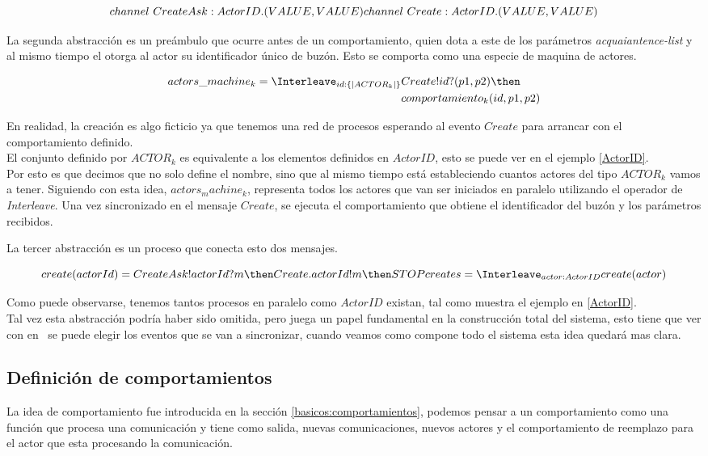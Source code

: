 \[
channel\ CreateAsk:ActorID.(VALUE, VALUE)\\
channel\ Create:ActorID.(VALUE, VALUE)
\]

La segunda abstracción es un preámbulo que ocurre antes de un comportamiento, quien dota a este de 
los parámetros \textit{acquaiantence-list} y al mismo tiempo el otorga al actor su identificador 
único de buzón. Esto se comporta como una especie de maquina de actores.

\begin{align}
actors\_machine_k = \Interleave_{ id : \{| ACTOR_k |\} } & Create!id?(p1, p2) \then \\
&comportamiento_k(id, p1, p2)
\end{align}

En realidad, la creación es algo ficticio ya que tenemos una red de procesos \CSP esperando al 
evento $Create$ para arrancar con el comportamiento definido. \\
El conjunto definido por $ACTOR_k$ es equivalente a los elementos definidos  en $ActorID$, 
esto se puede ver en el ejemplo \ref{ActorID}. \\
Por esto es que decimos que no solo define el nombre, sino que al mismo tiempo está
estableciendo cuantos actores del tipo $ACTOR_k$ vamos a tener.
Siguiendo con esta idea, $actors_machine_k$, representa todos los actores 
que van ser iniciados en paralelo utilizando el operador de \textit{Interleave}.
Una vez sincronizado en el mensaje $Create$, se ejecuta el comportamiento que obtiene
el identificador del buzón y los parámetros recibidos.

La tercer abstracción es un proceso que conecta esto dos mensajes. 
 
\[
create(actorId) = CreateAsk!actorId?m \then Create.actorId!m \then STOP \\
creates = \Interleave_{actor : ActorID} create(actor)
\]

Como puede observarse, tenemos tantos procesos en paralelo como $ActorID$ existan, 
tal como muestra el ejemplo en \ref{ActorID}. \\
Tal vez esta abstracción podría haber sido omitida, pero juega un papel fundamental
en la construcción total del sistema, esto tiene que ver con en \CSP\ se puede elegir los 
eventos \cite[chap.~2,p.~55]{Roscoe:1997:TPC:550448} que se van a sincronizar, cuando 
veamos como compone todo el sistema esta idea quedará mas clara.


\subsection{Definición de comportamientos}
La idea de comportamiento fue introducida en la sección \ref{basicos:comportamientos}, 
podemos pensar a un comportamiento como una función que procesa una comunicación y tiene como salida,
nuevas comunicaciones, nuevos actores y el comportamiento de reemplazo para el
actor que esta procesando la comunicación.

